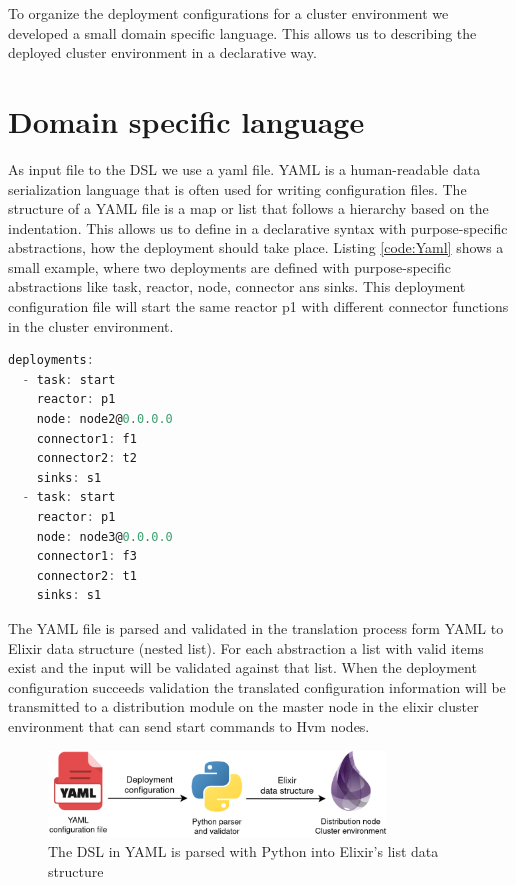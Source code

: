 \documentclass[a4paper]{book}
\begin{document}
To organize the deployment configurations for a cluster environment we developed a small domain specific language. This allows us to describing the deployed cluster environment in a declarative way.

\section{Domain specific language}
As input file to the DSL we use a yaml file. YAML is a human-readable data serialization language that is often used for writing configuration files. The structure of a YAML file is a map or list that follows a hierarchy based on the indentation. This allows us to define in a declarative syntax with purpose-specific abstractions, how the deployment should take place. Listing \ref{code:Yaml} shows a small example, where two deployments are defined with purpose-specific abstractions like task, reactor, node, connector ans sinks. This deployment configuration file will start the same reactor p1 with different connector functions in the cluster environment. 
\begin{lstlisting}[language=C, caption={YAML code}, captionpos=b,label={code:Yaml}, basicstyle=\ttfamily, frame=single]
deployments:
  - task: start
    reactor: p1
    node: node2@0.0.0.0
    connector1: f1
    connector2: t2
    sinks: s1
  - task: start
    reactor: p1
    node: node3@0.0.0.0
    connector1: f3
    connector2: t1
    sinks: s1
\end{lstlisting}
The YAML file is parsed and validated in the translation process form YAML to Elixir data structure (nested list). For each abstraction a list with valid items exist and the input will be validated against that list. When the deployment configuration succeeds validation the translated configuration information will be transmitted to a distribution module on the master node in the elixir cluster environment that can send start commands to Hvm nodes.

\begin{figure}[h]
	\centering
	\includegraphics[width=0.8\textwidth]{yaml.drawio}
	\caption{The DSL in YAML is parsed with Python into Elixir's list data structure}
	\label{fig:yaml}
\end{figure}  
\end{document}
